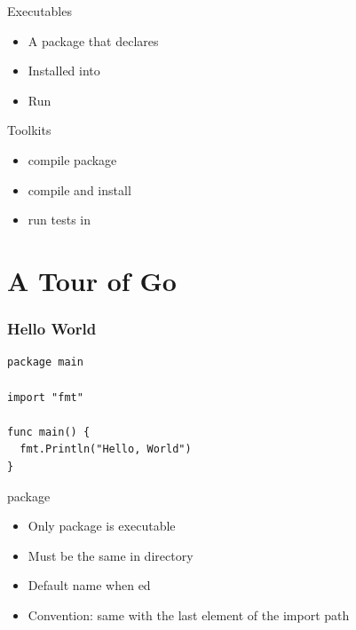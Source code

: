 \documentclass[xetex,mathserif,serif,12pt]{beamer}
\begin{document}
\begin{frame}{Executables}
  \begin{itemize}[<+->]
  \item A package that declares 
  \item Installed into 
  \item Run 
  \end{itemize}
\end{frame}

\begin{frame}{Toolkits}
  \begin{itemize}[<+->]
  \item {} compile package
  \item {} compile and install
  \item {} run tests in 
  \end{itemize}
\end{frame}

\section{A Tour of Go}
\label{sec:tour}


\begin{frame}[fragile]
  \frametitle{Hello World}

  \begin{beamer@nomargin}
    \begin{lstlisting}[basicstyle=\small\ttfamily]
package main

import "fmt"

func main() {
  fmt.Println("Hello, World")
}
    \end{lstlisting}
  \end{beamer@nomargin}
\end{frame}

\begin{frame}{\ttfamily package}
  \begin{itemize}
  \item Only package  is executable
  \item Must be the same in directory
  \item Default name when ed
  \item Convention: same with the last element of the import path
  \end{itemize}
\end{frame}
\end{document}
